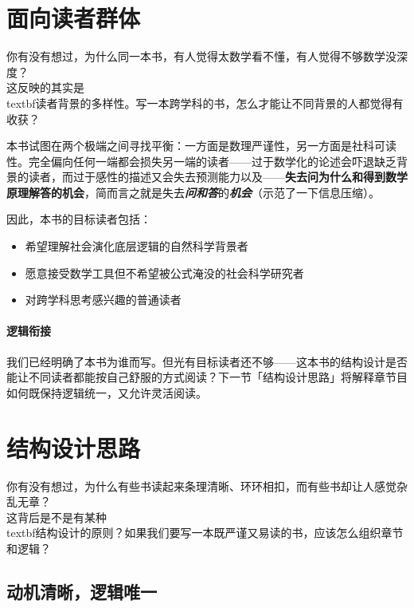 \documentclass[../main.tex]{subfiles}
\begin{document}
	\section{面向读者群体}

	\begin{readingnote}
		你有没有想过，为什么同一本书，有人觉得太数学看不懂，有人觉得不够数学没深度？\\
		这反映的其实是\\textbf{读者背景的多样性}。写一本跨学科的书，怎么才能让不同背景的人都觉得有收获？
	\end{readingnote}

本书试图在两个极端之间寻找平衡：一方面是数理严谨性，另一方面是社科可读性。完全偏向任何一端都会损失另一端的读者——过于数学化的论述会吓退缺乏背景的读者，而过于感性的描述又会失去预测能力以及——\textbf{失去问为什么和得到数学原理解答的机会}，简而言之就是失去{\large \emph{\textbf{问和答}}}的\textbf{\emph{机会}}（示范了一下信息压缩）。

	因此，本书的目标读者包括：
	\begin{itemize}
		\item 希望理解社会演化底层逻辑的自然科学背景者
		\item 愿意接受数学工具但不希望被公式淹没的社会科学研究者
		\item 对跨学科思考感兴趣的普通读者
	\end{itemize}

	\paragraph*{逻辑衔接}
	我们已经明确了本书为谁而写。但光有目标读者还不够——这本书的结构设计是否能让不同读者都能按自己舒服的方式阅读？下一节「结构设计思路」将解释章节目如何既保持逻辑统一，又允许灵活阅读。

	\section{结构设计思路}

	\begin{readingnote}
		你有没有想过，为什么有些书读起来条理清晰、环环相扣，而有些书却让人感觉杂乱无章？\\
		这背后是不是有某种\\textbf{结构设计的原则}？如果我们要写一本既严谨又易读的书，应该怎么组织章节和逻辑？
	\end{readingnote}

	\subsection{ 动机清晰，逻辑唯一}
\end{document}
